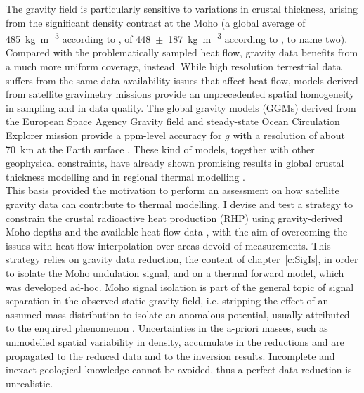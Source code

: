 The gravity field is particularly sensitive to variations in crustal thickness, arising from the significant density contrast at the Moho (a global average of \SI{485}{\kilo \gram \per \cubic \metre} according to \cite{Tenzer2012contrast}, of \num{448}~$\pm$~\SI{187}{\kilo \gram \per \cubic \metre} according to \cite{Sjoberg2011}, to name two).
Compared with the problematically sampled heat flow, gravity data benefits from a much more uniform coverage, instead.
While high resolution terrestrial data suffers from the same data availability issues that affect heat flow, models derived from satellite gravimetry missions provide an unprecedented spatial homogeneity in sampling and in data quality.
The global gravity models (GGMs) derived from the European Space Agency Gravity field and steady-state Ocean Circulation Explorer mission \parencite[GOCE,][]{Floberghagen2011_goce} provide a ppm-level accuracy for $g$ with a resolution of about \SI{70}{\kilo \metre} at the Earth surface \parencites{Brockmann2014}{Kvas_GOCO06s_dataset}.
These kind of models, together with other geophysical constraints, have already shown promising results in global crustal thickness modelling \parencites[e.g.][]{Eshagh2011}{Reguzzoni2015} and in regional thermal modelling \parencite{Bouman2015}.
\\

This basis provided the motivation to perform an assessment on how satellite gravity data can contribute to thermal modelling.
I devise and test a strategy to constrain the crustal radioactive heat production (RHP) using gravity-derived Moho depths and the available heat flow data \parencite{globalHF}, with the aim of overcoming the issues with heat flow interpolation over areas devoid of measurements.
This strategy relies on gravity data reduction, the content of chapter~\ref{c:SigIs}, in order to isolate the Moho undulation signal, and on a thermal forward model, which was developed ad-hoc.
Moho signal isolation is part of the general topic of signal separation in the observed static gravity field, i.e. stripping the effect of an assumed mass distribution to isolate an anomalous potential, usually attributed to the enquired phenomenon \parencites{Mikuska2007}{Sjoberg2013}{Aitken2015}[][, to name a few]{Tenzer2019}.
Uncertainties in the a-priori masses, such as unmodelled spatial variability in density, accumulate in the reductions and are propagated to the reduced data and to the inversion results.
Incomplete and inexact geological knowledge cannot be avoided, thus a perfect data reduction is unrealistic.

